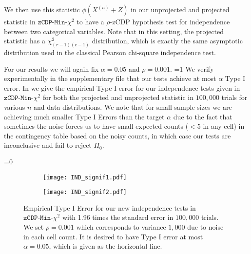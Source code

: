 \documentclass[twoside,letterpaper]{article} \usepackage{aistats2017}
\theoremstyle{definition}
\theoremstyle{remark}
\begin{document}
We then use this statistic $\phi({X^{({n})}}+Z)$ in our unprojected and projected statistic in ${\texttt{zCDP-Min-$\chi^2$}}$ to have a $\rho$-zCDP hypothesis test for independence between two categorical variables.  Note that in this setting, the projected statistic has a $\chi^2_{(r-1)(c-1)}$ distribution, which is exactly the same asymptotic distribution used in the classical Pearson chi-square independence test.  

For our results we will again fix $\alpha = 0.05$ and $\rho = 0.001$. 
=1
We verify experimentally in the supplementary file that our tests achieve at most $\alpha$ Type I error.
\else
In  we give the empirical Type I error for our independence tests given in ${\texttt{zCDP-Min-$\chi^2$}}$ for both the projected and unprojected statistic in $100,000$ trials for various $n$ and data distributions.  We note that for small sample sizes we are achieving much smaller Type I Errors than the target $\alpha$ due to the fact that sometimes the noise forces us to have small expected counts ($<5$ in any cell) in the contingency table based on the noisy counts, in which case our tests are inconclusive and fail to reject $H_0$.  
\fi

=0
\begin{figure}
\begin{center}
\begin{subfigure}{.45\textwidth}
\begin{flushleft}
\texttt{[image: IND\_signif1.pdf]}
\end{flushleft}
\end{subfigure}
\begin{subfigure}{.1\textwidth}
\end{subfigure}
\hspace{10mm}
\begin{subfigure}{.45\textwidth}
\begin{flushright}
\texttt{[image: IND\_signif2.pdf]}
\end{flushright}
\end{subfigure}
\caption{Empirical Type I Error for our new independence tests in ${\texttt{zCDP-Min-$\chi^2$}}$ with 1.96 times the standard error in $100,000$ trials.  We set $\rho = 0.001$ which corresponds to variance $1,000$ due to noise in each cell count.  It is desired to have Type I error at most $\alpha=0.05$, which is given as the horizontal line.  \label{fig:IND_signif} }
\end{center}
\end{figure}
\fi
\end{document}
